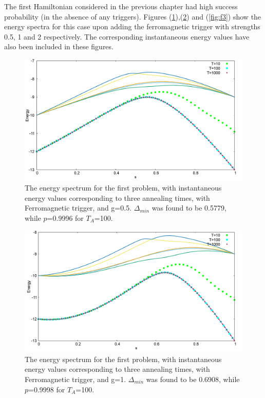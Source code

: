 \documentclass[12]{article}
\begin{document}
The first Hamiltonian considered in the previous chapter had high success probability (in the absence of any triggers). Figures (\ref{fig:f1}),(\ref{fig:f2}) and (\ref{fig:f3}) show the energy spectra for this case upon adding the ferromagnetic trigger with strengths 0.5, 1 and 2 respectively. The corresponding instantaneous energy values have also been included in these figures. 
\begin{figure}[H]
\centering 
\includegraphics[scale=0.3]{733_s12_F_g0.png}
\caption{The energy spectrum for the first problem, with instantaneous energy values corresponding to three annealing times, with Ferromagnetic trigger, and g=0.5. $\Delta_{min}$ was found to be 0.5779, while $p$=0.9996 for $T_A$=100. }
\label{fig:f1}
\end{figure}
\begin{figure}[H]
\centering 
\includegraphics[scale=0.3]{733_s12_F_g1.png}
\caption{The energy spectrum for the first problem, with instantaneous energy values corresponding to three annealing times, with Ferromagnetic trigger, and g=1. $\Delta_{min}$ was found to be 0.6908, while $p$=0.9998 for $T_A$=100.}
\label{fig:f2}
\end{figure}
\end{document}
